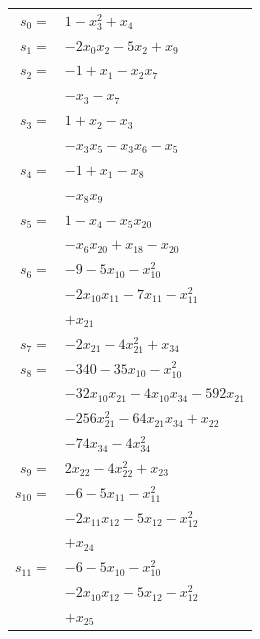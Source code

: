 \begingroup
\small
\setlength{\tabcolsep}{2pt}
\setlength{\LTleft}{0pt}
\begin{longtable}{@{}r@{\;}l@{}}
\(s_{0}=\) & \(\displaystyle 1 -x_{3}^{2} +x_{4}\) \\[3pt]
\(s_{1}=\) & \(\displaystyle -2x_{0}x_{2} -5x_{2} +x_{9}\) \\[3pt]
\(s_{2}=\) & \(\displaystyle -1 +x_{1} -x_{2}x_{7}\) \\
 & \(\displaystyle -x_{3} -x_{7}\) \\[3pt]
\(s_{3}=\) & \(\displaystyle 1 +x_{2} -x_{3}\) \\
 & \(\displaystyle -x_{3}x_{5} -x_{3}x_{6} -x_{5}\) \\[3pt]
\(s_{4}=\) & \(\displaystyle -1 +x_{1} -x_{8}\) \\
 & \(\displaystyle -x_{8}x_{9}\) \\[3pt]
\(s_{5}=\) & \(\displaystyle 1 -x_{4} -x_{5}x_{20}\) \\
 & \(\displaystyle -x_{6}x_{20} +x_{18} -x_{20}\) \\[3pt]
\(s_{6}=\) & \(\displaystyle -9 -5x_{10} -x_{10}^{2}\) \\
 & \(\displaystyle -2x_{10}x_{11} -7x_{11} -x_{11}^{2}\) \\
 & \(\displaystyle +x_{21}\) \\[3pt]
\(s_{7}=\) & \(\displaystyle -2x_{21} -4x_{21}^{2} +x_{34}\) \\[3pt]
\(s_{8}=\) & \(\displaystyle -340 -35x_{10} -x_{10}^{2}\) \\
 & \(\displaystyle -32x_{10}x_{21} -4x_{10}x_{34} -592x_{21}\) \\
 & \(\displaystyle -256x_{21}^{2} -64x_{21}x_{34} +x_{22}\) \\
 & \(\displaystyle -74x_{34} -4x_{34}^{2}\) \\[3pt]
\(s_{9}=\) & \(\displaystyle 2x_{22} -4x_{22}^{2} +x_{23}\) \\[3pt]
\(s_{10}=\) & \(\displaystyle -6 -5x_{11} -x_{11}^{2}\) \\
 & \(\displaystyle -2x_{11}x_{12} -5x_{12} -x_{12}^{2}\) \\
 & \(\displaystyle +x_{24}\) \\[3pt]
\(s_{11}=\) & \(\displaystyle -6 -5x_{10} -x_{10}^{2}\) \\
 & \(\displaystyle -2x_{10}x_{12} -5x_{12} -x_{12}^{2}\) \\
 & \(\displaystyle +x_{25}\) \\[3pt]

\end{longtable}

